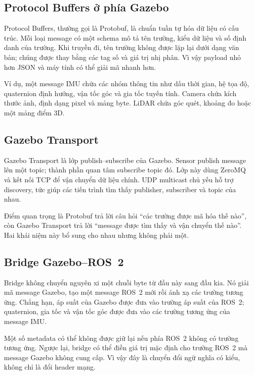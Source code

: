 \documentclass[a4paper]{article}
\begin{document}
\subsection{Protocol Buffers ở phía Gazebo}

Protocol Buffers, thường gọi là Protobuf, là chuẩn tuần tự hóa dữ liệu có cấu trúc. Mỗi loại message có một schema mô tả tên trường, kiểu dữ liệu và số định danh của trường. Khi truyền đi, tên trường không được lặp lại dưới dạng văn bản; chúng được thay bằng các tag số và giá trị nhị phân. Vì vậy payload nhỏ hơn JSON và máy tính có thể giải mã nhanh hơn.

Ví dụ, một message IMU chứa các nhóm thông tin như dấu thời gian, hệ tọa độ, quaternion định hướng, vận tốc góc và gia tốc tuyến tính. Camera chứa kích thước ảnh, định dạng pixel và mảng byte. LiDAR chứa góc quét, khoảng đo hoặc một mảng điểm 3D.

\subsection{Gazebo Transport}

Gazebo Transport là lớp publish--subscribe của Gazebo. Sensor publish message lên một topic; thành phần quan tâm subscribe topic đó. Lớp này dùng ZeroMQ và kết nối TCP để vận chuyển dữ liệu chính. UDP multicast chủ yếu hỗ trợ discovery, tức giúp các tiến trình tìm thấy publisher, subscriber và topic của nhau.

Điểm quan trọng là Protobuf trả lời câu hỏi ``các trường được mã hóa thế nào'', còn Gazebo Transport trả lời ``message được tìm thấy và vận chuyển thế nào''. Hai khái niệm này bổ sung cho nhau nhưng không phải một.

\subsection{Bridge Gazebo--ROS~2}

Bridge không chuyển nguyên xi một chuỗi byte từ đầu này sang đầu kia. Nó giải mã message Gazebo, tạo một message ROS~2 mới rồi ánh xạ các trường tương ứng. Chẳng hạn, áp suất của Gazebo được đưa vào trường áp suất của ROS~2; quaternion, gia tốc và vận tốc góc được đưa vào các trường tương ứng của message IMU.

Một số metadata có thể không được giữ lại nếu phía ROS~2 không có trường tương ứng. Ngược lại, bridge có thể điền giá trị mặc định cho trường ROS~2 mà message Gazebo không cung cấp. Vì vậy đây là chuyển đổi ngữ nghĩa có kiểu, không chỉ là đổi header mạng.
\end{document}
